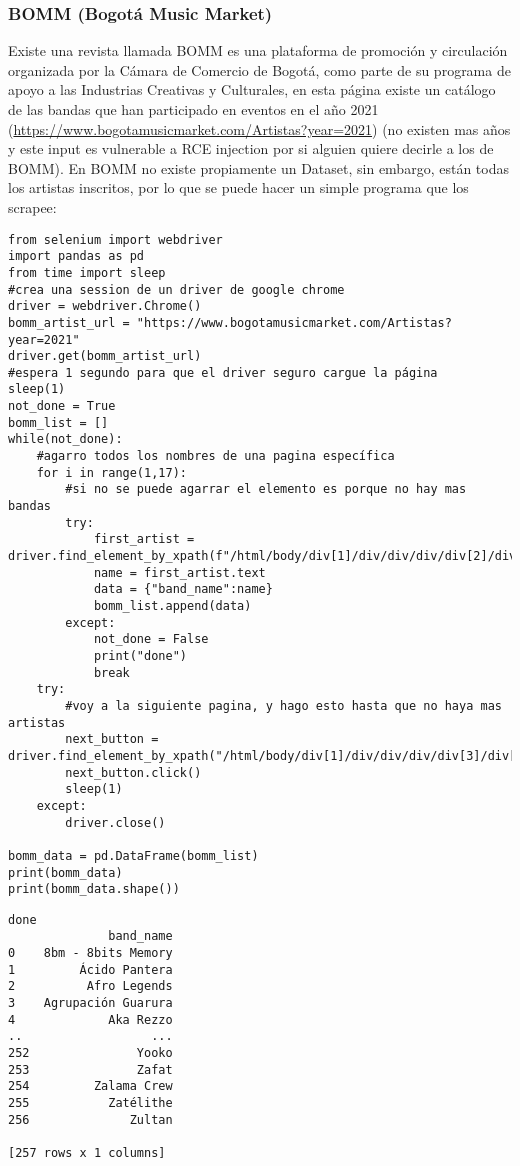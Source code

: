 \documentclass[11pt]{article}
\begin{document}
\subsubsection{BOMM (Bogotá Music Market)}
\label{sec:org28476e1}
Existe una revista llamada BOMM es una plataforma de promoción y circulación organizada por la Cámara de Comercio de Bogotá, como parte de su programa de apoyo a las Industrias Creativas y Culturales, en esta página existe un catálogo de las bandas que han participado en eventos en el año 2021 (\url{https://www.bogotamusicmarket.com/Artistas?year=2021}) (no existen mas años y este input es vulnerable a RCE injection por si alguien quiere decirle a los de BOMM).
En BOMM no existe propiamente un Dataset, sin embargo, están todas los artistas inscritos, por lo que se puede hacer un simple programa que los scrapee:
\begin{verbatim}
from selenium import webdriver
import pandas as pd
from time import sleep
#crea una session de un driver de google chrome
driver = webdriver.Chrome()
bomm_artist_url = "https://www.bogotamusicmarket.com/Artistas?year=2021"
driver.get(bomm_artist_url)
#espera 1 segundo para que el driver seguro cargue la página
sleep(1)
not_done = True
bomm_list = []
while(not_done):
    #agarro todos los nombres de una pagina específica
    for i in range(1,17):
        #si no se puede agarrar el elemento es porque no hay mas bandas
        try:
            first_artist = driver.find_element_by_xpath(f"/html/body/div[1]/div/div/div/div[2]/div/div[{i}]/figure/figcaption/h4/a")
            name = first_artist.text
            data = {"band_name":name}
            bomm_list.append(data)
        except:
            not_done = False
            print("done")
            break
    try:
        #voy a la siguiente pagina, y hago esto hasta que no haya mas artistas
        next_button = driver.find_element_by_xpath("/html/body/div[1]/div/div/div/div[3]/div[3]/div/a")
        next_button.click()
        sleep(1)
    except:
        driver.close()

bomm_data = pd.DataFrame(bomm_list)
print(bomm_data)
print(bomm_data.shape())
\end{verbatim}

\begin{verbatim}
done
              band_name
0    8bm - 8bits Memory
1         Ácido Pantera
2          Afro Legends
3    Agrupación Guarura
4             Aka Rezzo
..                  ...
252               Yooko
253               Zafat
254         Zalama Crew
255           Zatélithe
256              Zultan

[257 rows x 1 columns]
\end{verbatim}
\end{document}
